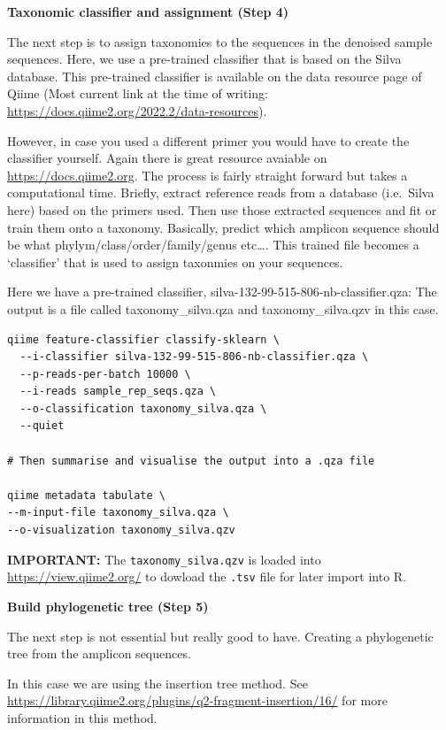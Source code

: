 \documentclass[
]{book}
\begin{document}
\hfill\break

\textbf{Taxonomic classifier and assignment (Step 4)}

The next step is to assign taxonomies to the sequences in the denoised sample sequences. Here, we use a pre-trained classifier that is based on the Silva database. This pre-trained classifier is available on the data resource page of Qiime (Most current link at the time of writing: \url{https://docs.qiime2.org/2022.2/data-resources}).

However, in case you used a different primer you would have to create the classifier yourself. Again there is great resource avaiable on \url{https://docs.qiime2.org}. The process is fairly straight forward but takes a computational time. Briefly, extract reference reads from a database (i.e.~Silva here) based on the primers used. Then use those extracted sequences and fit or train them onto a taxonomy. Basically, predict which amplicon sequence should be what phylym/class/order/family/genus etc\ldots. This trained file becomes a `classifier' that is used to assign taxonmies on your sequences.

Here we have a pre-trained classifier, silva-132-99-515-806-nb-classifier.qza:
The output is a file called taxonomy\_silva.qza and taxonomy\_silva.qzv in this case.

\begin{verbatim}
qiime feature-classifier classify-sklearn \
  --i-classifier silva-132-99-515-806-nb-classifier.qza \
  --p-reads-per-batch 10000 \
  --i-reads sample_rep_seqs.qza \
  --o-classification taxonomy_silva.qza \
  --quiet

# Then summarise and visualise the output into a .qza file

qiime metadata tabulate \
--m-input-file taxonomy_silva.qza \
--o-visualization taxonomy_silva.qzv
\end{verbatim}

\textbf{IMPORTANT:} The \texttt{taxonomy\_silva.qzv} is loaded into \url{https://view.qiime2.org/} to dowload the \texttt{.tsv} file for later import into R.

\hfill\break

\textbf{Build phylogenetic tree (Step 5)}

The next step is not essential but really good to have. Creating a phylogenetic tree from the amplicon sequences.

In this case we are using the insertion tree method. See \url{https://library.qiime2.org/plugins/q2-fragment-insertion/16/} for more information in this method.
\end{document}
